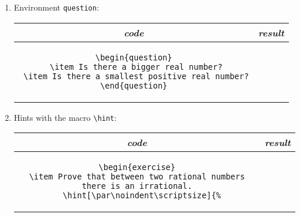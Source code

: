 \documentclass[12pt,a4page]{article}
\begin{document}
\begin{enumerate}
\begin{center}
\begin{tabular}{c|p{}}
    \end{tabular}
  \end{center}
\item Environment \verb|question|:
  \begin{center}
    \footnotesize
    \begin{tabular}{c|p{}}
      \textit{\large code} & \hfill\textit{\large result}\hfill\phantom{.} \\ \hline
      \begin{minipage}[t]{0.4\textwidth}
\begin{lstlisting}
\begin{question}
 \item Is there a bigger real number?
 \item Is there a smallest positive real number?
\end{question}
\end{lstlisting}
\end{minipage} &
                 \begin{question}
                 \item Is there a bigger real number?
                 \item Is there a smallest positive real number?
                 \end{question}
    \end{tabular}
  \end{center}
\item Hints with the macro \verb|\hint|:
  \begin{center}
    \footnotesize
    \begin{tabular}{c|p{}}
      \textit{\large code} & \hfill\textit{\large result}\hfill\phantom{.} \\ \hline
      \begin{minipage}[t]{0.4\textwidth}
\begin{lstlisting}
\begin{exercise}
\item Prove that between two rational numbers there is an irrational.
  \hint[\par\noindent\scriptsize]{%

\end{lstlisting}
\end{minipage}
\end{tabular}
\end{center}
\end{enumerate}
\end{document}
